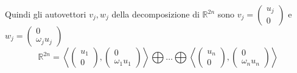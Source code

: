 \documentclass[11pt,a4paper,twoside]{book}
\theoremstyle{esss}
\theoremstyle{dotless}
\numberwithin{equation}{section} %
\begin{document}
Quindi gli autovettori $v_j,w_j$ della decomposizione di $\mathbb{R}^{2n}$ sono $v_j=\left(\begin{array}{c}u_j \\ 0 \end{array}\right)$ e $w_j=\left(\begin{array}{c}0 \\ \omega_j u_j \end{array}\right)$
\begin{equation}
\mathbb{R}^{2n}=\left\langle \left(\begin{array}{c}u_1 \\ 0 \end{array}\right) , \left(\begin{array}{c}0 \\ \omega_1 u_1 \end{array}\right)  \right\rangle \bigoplus \dots \bigoplus \left\langle \left(\begin{array}{c}u_n \\ 0 \end{array}\right) , \left(\begin{array}{c}0 \\ \omega_n u_n \end{array}\right)  \right\rangle 
\end{equation}
\end{document}
